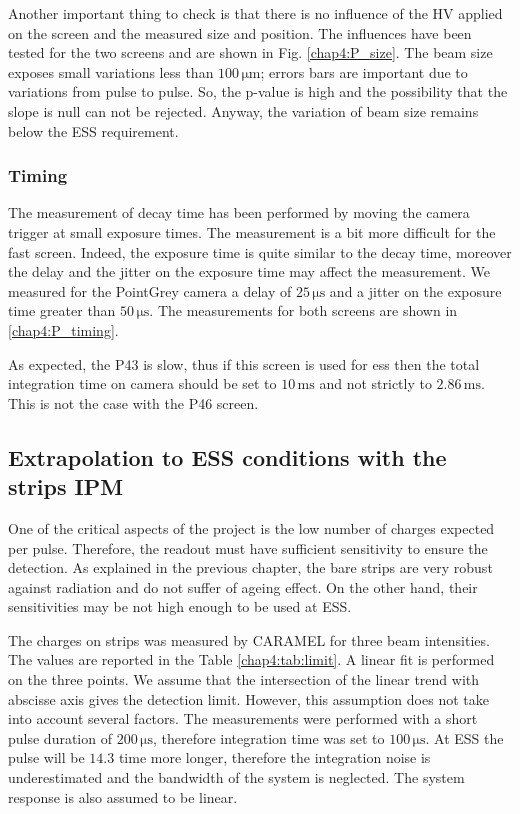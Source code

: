 \begin{refsection}
  Another important thing to check is that there is no influence of the HV applied on the screen and the measured size and position. The influences have been tested for the two screens and are shown in Fig. \ref{chap4:P_size}. The beam size exposes small variations less than $100\,\mathrm{\mu m}$; errors bars are important due to variations from pulse to pulse. So, the p-value is high and the possibility that the slope is null can not be rejected. Anyway, the variation of beam size remains below the ESS requirement.

  

  \subsubsection{Timing}
  The measurement of decay time has been performed by moving the camera trigger at small exposure times. The measurement is a bit more difficult for the fast screen. Indeed, the exposure time is quite similar to the decay time, moreover the delay and the jitter on the exposure time may affect the measurement.
  We measured for the PointGrey camera a delay of $25\,\mathrm{\mu s}$ and a jitter on the exposure time greater than $50\,\mathrm{\mu s}$. The measurements for both screens are shown in \ref{chap4:P_timing}.

  

  As expected, the P43 is slow, thus if this screen is used for \acrshort{ess} then the total integration time on camera should be set to $10\,\mathrm{ms}$ and not strictly to $2.86\,\mathrm{ms}$. This is not the case with the P46 screen.

  \subsection{Extrapolation to ESS conditions with the strips IPM}

  One of the critical aspects of the project is the low number of charges expected per pulse. Therefore, the  readout must have sufficient sensitivity to ensure the detection. As explained in the previous chapter, the bare strips are very robust against radiation and do not suffer of ageing effect. On the other hand, their sensitivities may be not high enough to be used at ESS.

  

  The charges on strips was measured by CARAMEL for three beam intensities. The values are reported in the Table \ref{chap4:tab:limit}. A linear fit is performed on the three points. We assume that the intersection of the linear trend with abscisse axis gives the detection limit. However, this assumption does not take into account several factors. The measurements were performed with a short pulse duration of $200\,\mathrm{\mu s}$, therefore integration time was set to $100\,\mathrm{\mu s}$. At ESS the pulse will be $14.3$ time more longer, therefore the integration noise is underestimated and the bandwidth of the system is neglected. The system response is also assumed to be linear.


\end{refsection}
